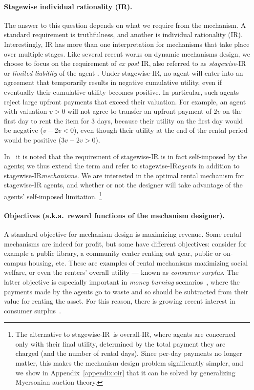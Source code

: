 \documentclass[11pt,letterpaper]{article}
\newcommand{\swir}{stagewise-IR\xspace}
\newcommand{\oir}{overall-IR\xspace}
\theoremstyle{plain}
\begin{document}
\paragraph{Stagewise individual rationality (IR).}
The answer to this question depends on what we require from the mechanism. A standard requirement is truthfulness, and another is individual rationality (IR). Interestingly, IR has more than one interpretation for mechanisms that take place over multiple stages. 
Like several recent works on dynamic mechanisms design, we choose to focus on the requirement of \emph{ex post} IR, also referred to as \emph{stagewise}-IR or \emph{limited liability} of the agent \cite{MirrokniLTZ16,MirrokniLTZ18,BravermanSW21,0001DMS18,AshlagiDH16,BalseiroML17}. 
Under \swir, no agent will enter into an agreement that temporarily results in negative cumulative utility, even if eventually their cumulative utility becomes positive. In particular, such agents reject large upfront payments that exceed their valuation. 
For example, an agent with valuation $v>0$ will not agree to transfer an upfront payment of $2v$ on the first day to rent the item for 3 days, because their utility on the first day would be negative ($v - 2v < 0$), even though their utility at the end of the rental period would be positive ($3v - 2v > 0$).

In~\cite{MirrokniLTZ18} it is noted that the requirement of \swir is in fact self-imposed by the agents; we thus extend the term and refer to \swir \emph{agents} in addition to \swir \emph{mechanisms}. We are interested in the optimal rental mechanism for \swir agents, and whether or not the designer will take advantage of the agents' self-imposed limitation.%
\footnote{The alternative to \swir\ is \oir, where agents are concerned only with their final utility, determined by the total payment they are charged (and the number of rental days). Since per-day payments no longer matter, this makes the mechanism design problem significantly simpler, and we show in Appendix~\ref{appendix:oir} that it can be solved by generalizing Myersonian auction theory.}

\paragraph{Objectives (a.k.a.~reward functions of the mechanism designer).}

A standard objective for mechanism design is maximizing revenue. Some rental mechanisms are indeed for profit, but some have different objectives: consider for example a public library, a community center renting out gear, public or on-campus housing, etc. These are examples of rental mechanisms maximizing social welfare, or even the renters' overall utility --- known as \emph{consumer surplus}. The latter objective is especially important in \emph{money burning} scenarios~\cite{HartlineR08}, where the payments made by the agents go to waste and so should be subtracted from their value for renting the asset. For this reason, there is growing recent interest in consumer surplus~\cite{ezra2024optimalmechanismsconsumersurplus, ganesh2023combinatorial}. 
\end{document}

